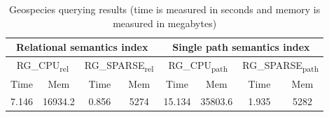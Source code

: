 {\small
	\setlength{\tabcolsep}{2pt}
	\begin{table}[h]
		\caption{Geospecies querying results (time is measured in seconds and memory is measured in megabytes)}
		\label{tbl:tableGeospeciesResults}
		\begin{tabular}{| c  c | c  c | c  c | c  c |}
			\hline
			
			\multicolumn{4}{|c|}{Relational semantics index}	&	\multicolumn{4}{|c|}{Single path semantics index} \\
			
			\hline
			
			
			\multicolumn{2}{|c|}{RG\_CPU\textsubscript{rel}}	&	\multicolumn{2}{|c|}{RG\_SPARSE\textsubscript{rel}} & \multicolumn{2}{|c|}{RG\_CPU\textsubscript{path}}	&	\multicolumn{2}{|c|}{RG\_SPARSE\textsubscript{path}}	 \\
			\hline
			Time & Mem & Time & Mem & Time & Mem & Time & Mem \\
			\hline
			\hline
			7.146 & 16934.2 & 0.856 & 5274 & 15.134 & 35803.6 & 1.935 & 5282   \\
			\hline
		\end{tabular}
	\end{table}
}

